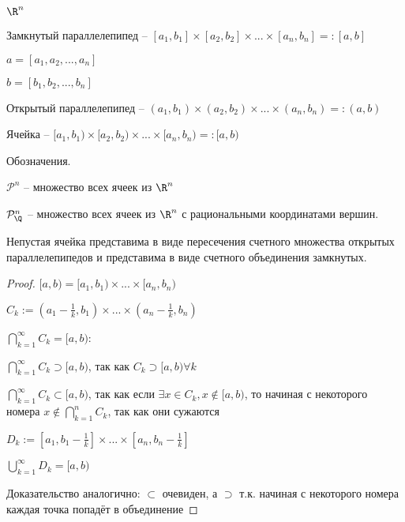 \begin{definition}\thmslashn
	
	$\R^n$
	
	Замкнутый параллелепипед -- $[a_1,b_1]\times[a_2, b_2]\times...\times[a_n, b_n] =: [a,b]$
	
	$a = [a_1,a_2,...,a_n]$
	
	$b = [b_1, b_2,...,b_n]$
	
	
	Открытый параллелепипед -- $(a_1,b_1)\times(a_2, b_2)\times...\times(a_n, b_n) =: (a,b)$
	
	
	Ячейка -- $[a_1,b_1)\times[a_2, b_2)\times...\times[a_n, b_n) =: [a,b)$
	
	Обозначения. 
	
	$\mathcal{P}^n$ -- множество всех ячеек из $\R^n$
	
	$\mathcal{P}^n_{\Q}$ -- множество всех ячеек из $\R^n$ с рациональными координатами вершин.
\end{definition}

\begin{theorem}\thmslashn
	
	Непустая ячейка представима в виде пересечения счетного множества открытых параллелепипедов и представима в виде счетного объединения замкнутых.
\end{theorem}

\begin{proof}\thmslashn
	
	$[a,b) = [a_1,b_1) \times...\times [a_n, b_n)$
	
	$C_k := (a_1 - \frac1k, b_1) \times ...\times (a_n-\frac1k, b_n)$
	
	$\bigcap\limits_{k=1}^{\infty} C_k = [a,b)$:

    $\bigcap\limits_{k=1}^{\infty} C_k \supset [a,b)$, так как $C_k \supset [a,b) \forall k$
    
    $\bigcap\limits_{k=1}^{\infty} C_k \subset [a,b)$, так как если $\exists x \in C_k, x \notin [a,b)$, то начиная с некоторого номера $x \notin \bigcap\limits_{k=1}^{n} C_k$, так как они сужаются

	$D_k := [a_1, b_1 - \frac1k]\times...\times [a_n, b_n - \frac1k]$
	
	$\bigcup\limits_{k=1}^{\infty}D_k = [a,b)$

    Доказательство аналогично: $\subset$ очевиден, а $\supset$ т.к. начиная с некоторого номера каждая точка попадёт в объединение
\end{proof}

